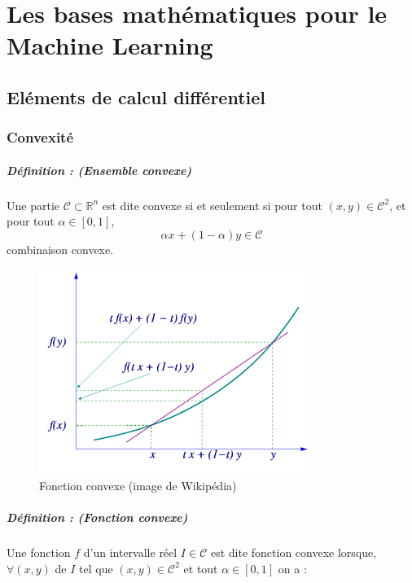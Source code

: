 \chapter{Les bases mathématiques pour le Machine Learning}
	\section{Eléments de calcul différentiel}
	\subsection{Convexité}
		\paragraph*{Définition : (Ensemble convexe)} 
		Une partie $\mathcal{C} \subset \mathbb{R}^n $ est dite convexe si et seulement si pour tout $(x,y) \in \mathcal{C}^2$, 
		et pour tout $ \alpha \in [0, 1]$,
		$$ \alpha x + (1 - \alpha)y \in \mathcal{C}$$ combinaison convexe.
		\begin{figure}
			\centering
			\includegraphics{images/convex_function_graph.png}
			\caption{Fonction convexe (image de Wikipédia)}
			\label{convexe_graph}
		\end{figure}
		\paragraph*{Définition : (Fonction convexe)}
		Une fonction $f$ d'un intervalle réel $I \in \mathcal{C}$ est dite fonction convexe lorsque, $\forall (x,y)$ de $I$ tel que $(x,y) \in \mathcal{C}^2$ et tout $\alpha \in [0, 1]$ on a :
		
				
